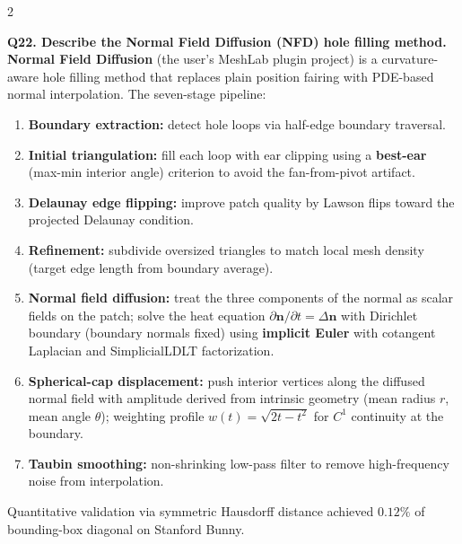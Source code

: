 \begin{paracol}{2}
\switchcolumn*

\textbf{Q22. Describe the Normal Field Diffusion (NFD) hole filling method.}\\
\textbf{Normal Field Diffusion} (the user's MeshLab plugin project) is a curvature-aware hole filling method that replaces plain position fairing with PDE-based normal interpolation. The seven-stage pipeline:
\begin{enumerate}[leftmargin=*,nosep]
\item \textbf{Boundary extraction:} detect hole loops via half-edge boundary traversal.
\item \textbf{Initial triangulation:} fill each loop with ear clipping using a \textbf{best-ear} (max-min interior angle) criterion to avoid the fan-from-pivot artifact.
\item \textbf{Delaunay edge flipping:} improve patch quality by Lawson flips toward the projected Delaunay condition.
\item \textbf{Refinement:} subdivide oversized triangles to match local mesh density (target edge length from boundary average).
\item \textbf{Normal field diffusion:} treat the three components of the normal as scalar fields on the patch; solve the heat equation $\partial \mathbf{n}/\partial t = \Delta \mathbf{n}$ with Dirichlet boundary (boundary normals fixed) using \textbf{implicit Euler} with cotangent Laplacian and SimplicialLDLT factorization.
\item \textbf{Spherical-cap displacement:} push interior vertices along the diffused normal field with amplitude derived from intrinsic geometry (mean radius $r$, mean angle $\theta$); weighting profile $w(t) = \sqrt{2t - t^2}$ for $C^1$ continuity at the boundary.
\item \textbf{Taubin smoothing:} non-shrinking low-pass filter to remove high-frequency noise from interpolation.
\end{enumerate}
Quantitative validation via symmetric Hausdorff distance achieved $0.12\%$ of bounding-box diagonal on Stanford Bunny.

\switchcolumn


\end{paracol}
